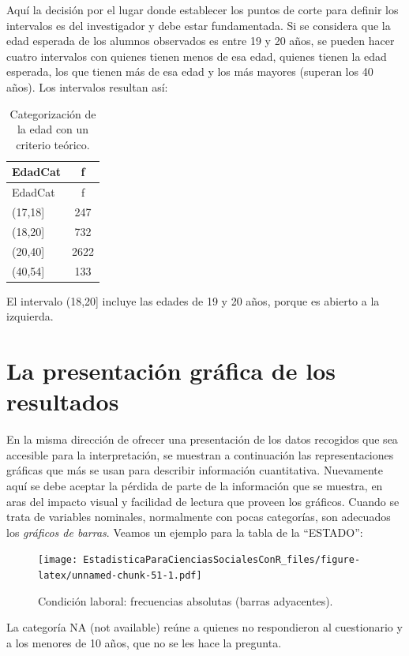 \documentclass[]{book}
\begin{document}
Aquí la decisión por el lugar donde establecer los puntos de corte para definir los intervalos es del investigador y debe estar fundamentada. Si se considera que la edad esperada de los alumnos observados es entre 19 y 20 años, se pueden hacer cuatro intervalos con quienes tienen menos de esa edad, quienes tienen la edad esperada, los que tienen más de esa edad y los más mayores (superan los 40 años). Los intervalos resultan así:

\begin{longtable}[]{@{}lc@{}}
\caption{\label{tab:unnamed-chunk-50}Categorización de la edad con un criterio teórico.}\tabularnewline
\toprule
EdadCat & f\tabularnewline
\midrule
\endfirsthead
\toprule
EdadCat & f\tabularnewline
\midrule
\endhead
(17,18{]} & 247\tabularnewline
(18,20{]} & 732\tabularnewline
(20,40{]} & 2622\tabularnewline
(40,54{]} & 133\tabularnewline
\bottomrule
\end{longtable}

El intervalo (18,20{]} incluye las edades de 19 y 20 años, porque es abierto a la izquierda.

\hypertarget{la-presentaciuxf3n-gruxe1fica-de-los-resultados}{%
\section{La presentación gráfica de los resultados}\label{la-presentaciuxf3n-gruxe1fica-de-los-resultados}}

En la misma dirección de ofrecer una presentación de los datos recogidos que sea accesible para la interpretación, se muestran a continuación las representaciones gráficas que más se usan para describir información cuantitativa. Nuevamente aquí se debe aceptar la pérdida de parte de la información que se muestra, en aras del impacto visual y facilidad de lectura que proveen los gráficos.
Cuando se trata de variables nominales, normalmente con pocas categorías, son adecuados los \emph{gráficos de barras}. Veamos un ejemplo para la tabla de la ``ESTADO'':

\begin{figure}
\centering
\texttt{[image: EstadisticaParaCienciasSocialesConR\_files/figure-latex/unnamed-chunk-51-1.pdf]}
\caption{\label{fig:unnamed-chunk-51}Condición laboral: frecuencias absolutas (barras adyacentes).}
\end{figure}

La categoría NA (not available) reúne a quienes no respondieron al cuestionario y a los menores de 10 años, que no se les hace la pregunta.
\end{document}
